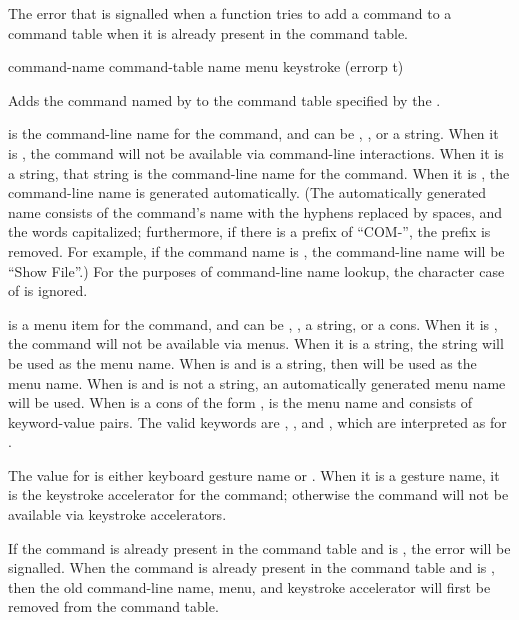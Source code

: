 The error that is signalled when a function tries to add a command to a command
table when it is already present in the command table.


 {command-name command-table 
                                       \key name menu keystroke (errorp t)}

Adds the command named by  to the command table specified by
the  .

 is the command-line name for the command, and can be ,
, or a string.  When it is , the command will not be available via
command-line interactions.  When it is a string, that string is the command-line
name for the command.  When it is , the command-line name is generated
automatically.  (The automatically generated name consists of the command's name
with the hyphens replaced by spaces, and the words capitalized; furthermore, if
there is a prefix of ``COM-'', the prefix is removed.  For example, if the
command name is , the command-line name will be ``Show
File''.)  For the purposes of command-line name lookup, the character case of
 is ignored.

 is a menu item for the command, and can be , , a
string, or a cons.  When it is , the command will not be available via
menus.  When it is a string, the string will be used as the menu name.  When
 is  and  is a string, then  will be used
as the menu name.  When  is  and  is not a string,
an automatically generated menu name will be used.  When  is a cons
of the form ,  is the menu
name and  consists of keyword-value pairs.  The valid
keywords are , , and , which are
interpreted as for .

The value for  is either keyboard gesture name or .  When
it is a gesture name, it is the keystroke accelerator for the command; otherwise
the command will not be available via keystroke accelerators.

If the command is already present in the command table and  is
, the  error will be signalled.  When the
command is already present in the command table and  is
, then the old command-line name, menu, and keystroke accelerator
will first be removed from the command table.


